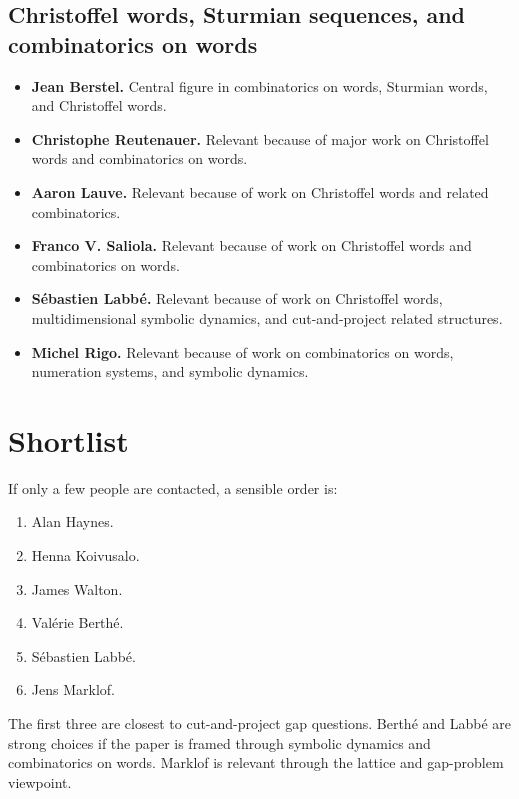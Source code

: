 \documentclass[11pt]{article}
\begin{document}
\subsection*{Christoffel words, Sturmian sequences, and combinatorics on words}

\begin{itemize}
    \item \textbf{Jean Berstel.}  Central figure in combinatorics on words,
    Sturmian words, and Christoffel words.

    \item \textbf{Christophe Reutenauer.}  Relevant because of major work on
    Christoffel words and combinatorics on words.

    \item \textbf{Aaron Lauve.}  Relevant because of work on Christoffel words
    and related combinatorics.

    \item \textbf{Franco V. Saliola.}  Relevant because of work on Christoffel
    words and combinatorics on words.

    \item \textbf{S\'{e}bastien Labb\'{e}.}  Relevant because of work on
    Christoffel words, multidimensional symbolic dynamics, and cut-and-project
    related structures.

    \item \textbf{Michel Rigo.}  Relevant because of work on combinatorics on
    words, numeration systems, and symbolic dynamics.
\end{itemize}

\section*{Shortlist}

If only a few people are contacted, a sensible order is:

\begin{enumerate}
    \item Alan Haynes.
    \item Henna Koivusalo.
    \item James Walton.
    \item Val\'{e}rie Berth\'{e}.
    \item S\'{e}bastien Labb\'{e}.
    \item Jens Marklof.
\end{enumerate}

The first three are closest to cut-and-project gap questions.  Berth\'{e} and
Labb\'{e} are strong choices if the paper is framed through symbolic dynamics
and combinatorics on words.  Marklof is relevant through the lattice and
gap-problem viewpoint.
\end{document}
